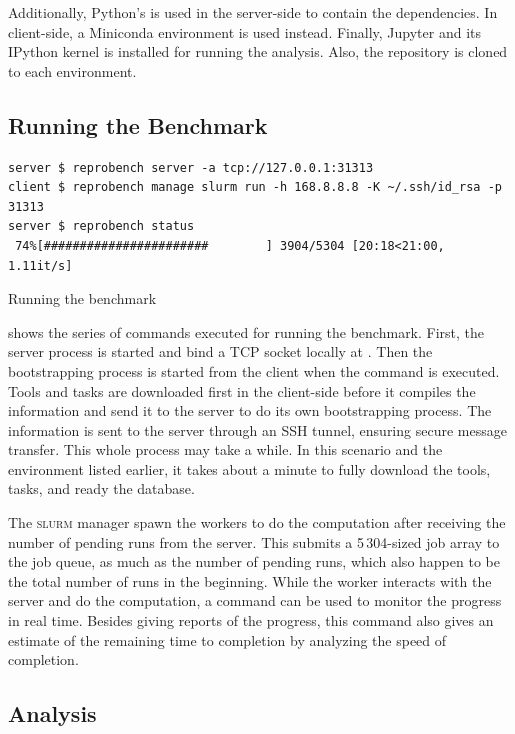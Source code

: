 Additionally, Python's  is used in the server-side to contain the dependencies.
In client-side, a Miniconda environment is used instead.
Finally, Jupyter and its IPython kernel is installed for running the analysis.
Also, the repository is cloned to each environment.

\subsection{Running the Benchmark}

\begin{listing}
	\begin{verbatim}
server $ reprobench server -a tcp://127.0.0.1:31313
client $ reprobench manage slurm run -h 168.8.8.8 -K ~/.ssh/id_rsa -p 31313
server $ reprobench status
 74%[#######################        ] 3904/5304 [20:18<21:00,  1.11it/s]
    \end{verbatim}
	\caption{Running the benchmark}
	\label{lst:eval.running}
\end{listing}

 shows the series of commands executed for running the benchmark.
First, the server process is started and bind a TCP socket locally at .
Then the bootstrapping process is started from the client when the  command is executed.
Tools and tasks are downloaded first in the client-side before it compiles the information and send it to the server to do its own bootstrapping process.
The information is sent to the server through an SSH tunnel, ensuring secure message transfer.
This whole process may take a while.
In this scenario and the environment listed earlier, it takes about a minute to fully download the tools, tasks, and ready the database.

The \textsc{slurm} manager spawn the workers to do the computation after receiving the number of pending runs from the server.
This submits a 5\,304-sized job array to the job queue, as much as the number of pending runs, which also happen to be the total number of runs in the beginning.
While the worker interacts with the server and do the computation, a  command can be used to monitor the progress in real time.
Besides giving reports of the progress, this command also gives an estimate of the remaining time to completion by analyzing the speed of completion.

\subsection{Analysis}

